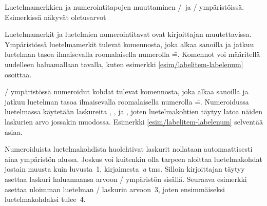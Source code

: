 \begin{esimerkki*}

\begin{koodilohko}
\renewcommand{\labelitemi}  {\textbullet} %
\renewcommand{\labelitemii} {\normalfont\bfseries\textendash}
\renewcommand{\labelitemiii}{\textasteriskcentered}
\renewcommand{\labelitemiv} {\textperiodcentered}

\renewcommand{\labelenumi}  {\arabic{enumi}.} %
\renewcommand{\labelenumii} {(\alph{enumii})}
\renewcommand{\labelenumiii}{\roman{enumiii}.}
\renewcommand{\labelenumiv} {\Alph{enumiv}.}
\end{koodilohko}
  \caption{Luetelmamerkkien ja numerointitapojen muuttaminen
    \-/\ ja \-/ ympäristöissä.
    Esimerkissä näkyvät oletusarvot}
  \label{esim/labelitem-labelenum}
\end{esimerkki*}

Luetelmamerkit ja luetelmien numerointitavat ovat kirjoittajan
muutettavissa. Ympäristössä  luetelmamerkit tulevat
komennosta, joka alkaa sanoilla  ja jatkuu
luetelman tasoa ilmaisevalla roomalaisella numerolla
\==. Komennot voi määritellä uudelleen haluamallaan
tavalla, kuten esimerkki \ref{esim/labelitem-labelenum} osoittaa.

\-/ ympäristössä numeroidut kohdat tulevat
komennosta, joka alkaa sanoilla  ja jatkuu
luetelman tasoa ilmaisevalla roomalaisella numerolla
\==. Numeroidussa luetelmassa käytetään laskureita
, ,  ja
, joten luetelmakohtien täytyy latoa näiden laskurien
arvo jossakin muodossa. Esimerkki \ref{esim/labelitem-labelenum}
selventää asiaa.

Numeroiduista luetelmakohdista huolehtivat laskurit nollataan
automaattisesti aina ympäristön alussa. Joskus voi kuitenkin olla
tarpeen aloittaa luetelmakohdat jostain muusta kuin luvusta~1,
kirjaimesta~\textit{a} tms. Silloin kirjoittajan täytyy asettaa laskuri
haluamaansa arvoon \-/ ympäristön sisällä. Seuraava
esimerkki asettaa uloimman luetelman \-/ laskurin
arvoon~3, joten ensimmäiseksi luetelmakohdaksi tulee~4.

